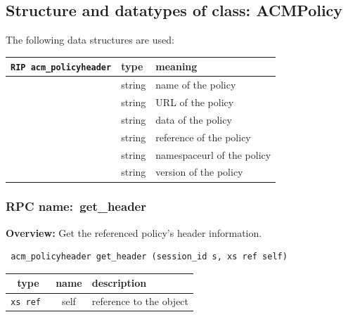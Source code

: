 \subsection{Structure and datatypes of class: ACMPolicy}

\vspace{0.5cm}
The following data structures are used:

\begin{longtable}{|l|l|l|}
\hline
{\tt RIP acm\_policyheader} & type & meaning \\
\hline
\hspace{0.5cm}{\tt policyname}   & string & name of the policy \\
\hspace{0.5cm}{\tt policyurl }   & string & URL of the policy \\
\hspace{0.5cm}{\tt date}         & string & data of the policy \\
\hspace{0.5cm}{\tt reference}    & string & reference of the policy \\
\hspace{0.5cm}{\tt namespaceurl} & string & namespaceurl of the policy \\
\hspace{0.5cm}{\tt version}      & string & version of the policy \\
\hline
\end{longtable}

\vspace{0.3cm}
\vspace{0.3cm}
\vspace{0.3cm}
\subsubsection{RPC name:~get\_header}

{\bf Overview:}
Get the referenced policy's header information.

\begin{verbatim} acm_policyheader get_header (session_id s, xs ref self)\end{verbatim}




\vspace{0.3cm}
\begin{tabular}{|c|c|p{7cm}|}
 \hline
{\bf type} & {\bf name} & {\bf description} \\ \hline
{\tt xs ref } & self & reference to the object \\ \hline

\end{tabular}

